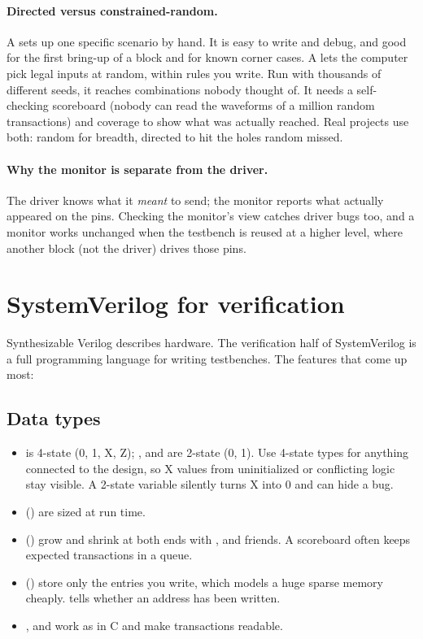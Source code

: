 \paragraph{Directed versus constrained-random.} A  sets up one specific scenario by hand. It is easy to write and debug, and good for the first bring-up of a block and for known corner cases. A  lets the computer pick legal inputs at random, within rules you write. Run with thousands of different seeds, it reaches combinations nobody thought of. It needs a self-checking scoreboard (nobody can read the waveforms of a million random transactions) and coverage to show what was actually reached. Real projects use both: random for breadth, directed to hit the holes random missed.

\paragraph{Why the monitor is separate from the driver.} The driver knows what it \emph{meant} to send; the monitor reports what actually appeared on the pins. Checking the monitor's view catches driver bugs too, and a monitor works unchanged when the testbench is reused at a higher level, where another block (not the driver) drives those pins.

\section{SystemVerilog for verification}

Synthesizable Verilog describes hardware. The verification half of SystemVerilog is a full programming language for writing testbenches. The features that come up most:

\subsection*{Data types}

\begin{itemize}
  \item {} is 4-state (0, 1, X, Z); ,  and  are 2-state (0, 1). Use 4-state types for anything connected to the design, so X values from uninitialized or conflicting logic stay visible. A 2-state variable silently turns X into 0 and can hide a bug.
  \item {} () are sized at run time.
  \item {} () grow and shrink at both ends with ,  and friends. A scoreboard often keeps expected transactions in a queue.
  \item {} () store only the entries you write, which models a huge sparse memory cheaply.  tells whether an address has been written.
  \item {},  and  work as in C and make transactions readable.
\end{itemize}


